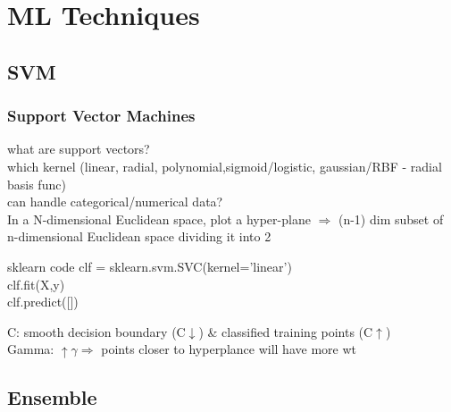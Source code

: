 \documentclass{beamer}
\begin{document}




\section{ML Techniques}


\subsection{SVM}

\begin{frame}\frametitle{Support Vector Machines}
	what are support vectors?\\
	which kernel (linear, radial, polynomial,sigmoid/logistic, gaussian/RBF - radial basis func)\\
	can handle categorical/numerical data?\\
	In a N-dimensional Euclidean space, plot a hyper-plane $\Rightarrow$ (n-1) dim subset of n-dimensional Euclidean space dividing it into 2\\
	\begin{alertblock}{sklearn code}
		clf = sklearn.svm.SVC(kernel='linear')\\
		clf.fit(X,y)\\
		clf.predict([])
	\end{alertblock}
	C: smooth decision boundary (C$\downarrow$) \& classified training points (C$\uparrow$)\\
	Gamma: $\uparrow \gamma \Rightarrow$ points closer to hyperplance will have more wt
\end{frame}


\subsection{Ensemble}
\end{document}
